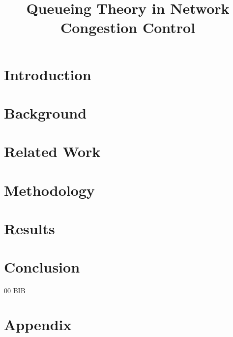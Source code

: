 \documentclass[conference]{IEEEtran}
\begin{document}
\title{Queueing Theory in Network Congestion Control}

\author{
}

\maketitle
\thispagestyle{plain}
\pagestyle{plain}

\begin{abstract}
    
\end{abstract}


\section{Introduction}


\section{Background}


\section{Related Work}


\section{Methodology}


\section{Results}


\section{Conclusion}


\begin{thebibliography}{00}
 BIB
\end{thebibliography}

\newpage
\onecolumn
\appendix
\section{Appendix}
\end{document}
